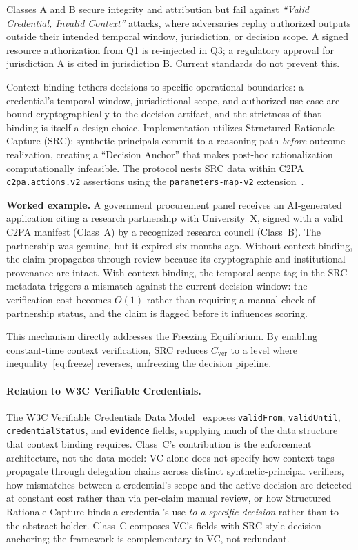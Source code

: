 \documentclass[runningheads]{llncs}
\begin{document}
Classes A and B secure integrity and attribution but fail against \emph{``Valid Credential, Invalid Context''} attacks, where adversaries replay authorized outputs outside their intended temporal window, jurisdiction, or decision scope. A signed resource authorization from Q1 is re-injected in Q3; a regulatory approval for jurisdiction A is cited in jurisdiction B. Current standards do not prevent this.

Context binding tethers decisions to specific operational boundaries: a credential's temporal window, jurisdictional scope, and authorized use case are bound cryptographically to the decision artifact, and the strictness of that binding is itself a design choice. Implementation utilizes Structured Rationale Capture (SRC): synthetic principals commit to a reasoning path \emph{before} outcome realization, creating a ``Decision Anchor'' that makes post-hoc rationalization computationally infeasible. The protocol nests SRC data within C2PA \texttt{c2pa.actions.v2} assertions using the \texttt{parameters-map-v2} extension~\cite{c2pa2024}.

\textbf{Worked example.} A government procurement panel receives an AI-generated application citing a research partnership with University~X, signed with a valid C2PA manifest (Class~A) by a recognized research council (Class~B). The partnership was genuine, but it expired six months ago. Without context binding, the claim propagates through review because its cryptographic and institutional provenance are intact. With context binding, the temporal scope tag in the SRC metadata triggers a mismatch against the current decision window: the verification cost becomes $O(1)$ rather than requiring a manual check of partnership status, and the claim is flagged before it influences scoring.

This mechanism directly addresses the Freezing Equilibrium. By enabling constant-time context verification, SRC reduces $C_{\mathrm{ver}}$ to a level where inequality~\eqref{eq:freeze} reverses, unfreezing the decision pipeline.

\paragraph{Relation to W3C Verifiable Credentials.}
The W3C Verifiable Credentials Data Model~\cite{w3cVc2024} exposes \texttt{validFrom}, \texttt{validUntil}, \texttt{credentialStatus}, and \texttt{evidence} fields, supplying much of the data structure that context binding requires. Class~C's contribution is the enforcement architecture, not the data model: VC alone does not specify how context tags propagate through delegation chains across distinct synthetic-principal verifiers, how mismatches between a credential's scope and the active decision are detected at constant cost rather than via per-claim manual review, or how Structured Rationale Capture binds a credential's use \emph{to a specific decision} rather than to the abstract holder. Class~C composes VC's fields with SRC-style decision-anchoring; the framework is complementary to VC, not redundant.
\end{document}
